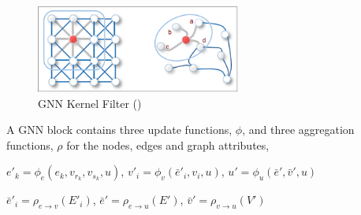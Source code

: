 \documentclass{report} %
\begin{document}
\begin{figure}[H]
    \centering
    \includegraphics[width=0.6\textwidth]{./ReportImages/GNNKernel.png} 
    \caption{\ac{GNN} Kernel Filter (\cite{GNN-2019})}
    \label{fig:GNN Kernel Filter}
\end{figure}

A \ac{GNN} block contains three update functions, \( \phi \), and three aggregation functions, \( \rho \) for the nodes, edges and graph attributes, \cite{GNNs-2018}

$e'_k = \phi_e(e_k, v_{r_k}, v_{s_k}, u)$, $v'_i = \phi_v(\bar{e}'_i, v_i, u)$, $u' = \phi_u(\bar{e}', \bar{v}', u)$

$\bar{e}'_i = \rho_{e \to v}(E'_i)$, $\bar{e}' = \rho_{e \to u}(E')$, $\bar{v}' = \rho_{v \to u}(V')$

\listoffigures

\newpage 

\listoftables

\newpage 
\end{document}
